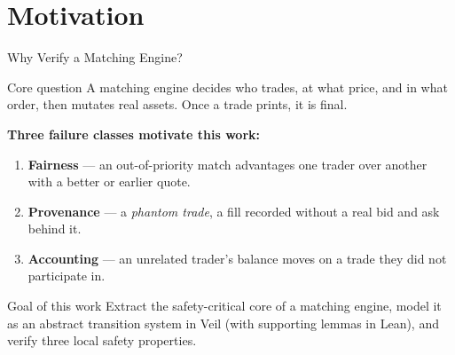 \section{Motivation}

\begin{frame}{Why Verify a Matching Engine?}

\begin{block}{Core question}
A matching engine decides \alert{who trades, at what price, and in what order}, then mutates real assets. Once a trade prints, it is final.
\end{block}

\textbf{Three failure classes motivate this work:}
\begin{enumerate}
    \item \textbf{Fairness} --- an out-of-priority match advantages one trader over another with a better or earlier quote.
    \item \textbf{Provenance} --- a \emph{phantom trade}, a fill recorded without a real bid and ask behind it.
    \item \textbf{Accounting} --- an unrelated trader's balance moves on a trade they did not participate in.
\end{enumerate}

\begin{block}{Goal of this work}
Extract the safety-critical core of a matching engine, model it as an abstract transition system in \alert{Veil} (with supporting lemmas in \alert{Lean}), and verify three local safety properties.
\end{block}

\end{frame}
